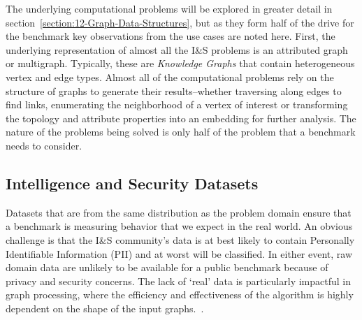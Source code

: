 The underlying computational problems will be explored in greater detail in section~\ref{section:12-Graph-Data-Structures}, but as they form half of the drive for the benchmark key observations from the use cases are noted here.
First, the underlying representation of almost all the I\&S problems is an attributed graph or multigraph. 
Typically, these are \textit{Knowledge Graphs} that contain heterogeneous vertex and edge types.
Almost all of the computational problems rely on the structure of graphs to generate their results--whether traversing along edges to find links, enumerating the neighborhood of a vertex of interest or transforming the topology and attribute properties into an embedding for further analysis.
The nature of the problems being solved is only half of the problem that a benchmark needs to consider. 

\subsection{Intelligence and Security Datasets}
Datasets that are from the same distribution as the problem domain ensure that a benchmark is measuring behavior that we expect in the real world.
An obvious challenge is that the I\&S community's data is at best likely to contain Personally Identifiable Information (PII) and at worst will be classified.
In either event, raw domain data are unlikely to be available for a public benchmark because of privacy and security concerns. 
The lack of `real' data is particularly impactful in graph processing, where the efficiency and effectiveness of the algorithm is highly dependent on the shape of the input graphs.~.

